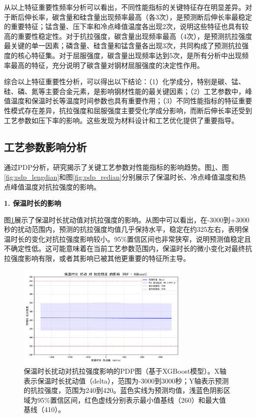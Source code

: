 \documentclass[12pt,a4paper]{article}
\begin{document}
从以上特征重要性频率分析可以看出，不同性能指标的关键特征存在明显差异。对于断后伸长率，碳含量和硅含量出现频率最高（各3次），是预测断后伸长率最稳定的重要特征；锰含量、压下率和冷点峰值温度各出现2次，说明这些特征也具有较高的重要性稳定性。对于抗拉强度，碳含量出现频率最高（4次），是预测抗拉强度最关键的单一因素；磷含量、硅含量和锰含量各出现3次，共同构成了预测抗拉强度的核心特征集。对于屈服强度，碳含量出现频率达到5次，是所有分析中出现频率最高的特征，充分说明了碳含量对钢材屈服强度的决定性作用。



综合以上特征重要性分析，可以得出以下结论：（1）化学成分，特别是碳、锰、硅、磷、氮等主要合金元素，是影响钢材性能的最关键因素；（2）工艺参数中，峰值温度和保温时长等温度时间参数也具有重要作用；（3）不同性能指标的特征重要性模式存在差异，抗拉强度和屈服强度主要受化学成分影响，而断后伸长率还受到工艺参数如压下率的影响。这些发现为材料设计和工艺优化提供了重要指导。

\subsection{工艺参数影响分析}

通过PDP分析，研究揭示了关键工艺参数对性能指标的影响趋势。图\ref{fig:pdp_baowen}、图\ref{fig:pdp_lengdian}和图\ref{fig:pdp_redian}分别展示了保温时长、冷点峰值温度和热点峰值温度对抗拉强度的影响。

\textbf{1. 保温时长的影响}

图\ref{fig:pdp_baowen}展示了保温时长扰动值对抗拉强度的影响。从图中可以看出，在-3000到+3000秒的扰动范围内，预测的抗拉强度均值几乎保持水平，稳定在约325左右，表明保温时长的变化对抗拉强度影响较小。95\%置信区间也非常狭窄，说明预测值稳定且不确定性低。这可能意味着在当前工艺参数范围内，保温时长的微小变化对最终抗拉强度影响有限，或者其影响已被其他更重要的特征所主导。

\begin{figure}[H]
\centering
\includegraphics[width=0.75\textwidth]{fig/02b_pdp_plot_holding_time_vs_tensile_strength.png}
\caption{保温时长扰动对抗拉强度影响的PDP图（基于XGBoost模型）。X轴表示保温时长扰动值（delta），范围为-3000到3000秒；Y轴表示预测的抗拉强度，范围为240到420。蓝色实线为预测均值，浅蓝色阴影区域为95\%置信区间，红色虚线分别表示最小值基线（260）和最大值基线（410）。}
\label{fig:pdp_baowen}
\end{figure}
\end{document}
